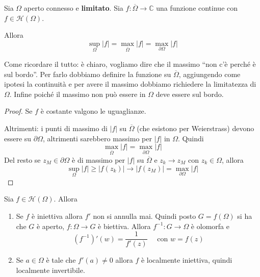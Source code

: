 \begin{corollary}
    Sia \(\Omega\) aperto connesso e \textbf{limitato}. Sia \(f :
    \overline{\Omega} \to \mathbb{C}\) una funzione continue con \(f \in
    \mathcal{H}{(\Omega)}\). 

    Allora
    \begin{equation}\label{eq:massimo-modulo}
      \sup_{\Omega} |f| = \max_{\overline{\Omega}} |f| = \max_{\partial \Omega}
      |f|
    \end{equation}
\end{corollary}
\begin{remark}
    Come ricordare il tutto: è chiaro, vogliamo dire che il massimo ``non c'è
    perché è sul bordo''. Per farlo dobbiamo definire la funzione su
    \(\overline{\Omega}\), aggiungendo come ipotesi la continuità e per avere il
    massimo dobbiamo richiedere la limitatezza di \(\Omega\). Infine poiché il
    massimo non può essere in \(\Omega\) deve essere sul bordo. 
\end{remark}
\begin{proof}
    Se \(f\) è costante valgono le uguaglianze.

    Altrimenti: i punti di massimo di \(|f|\) su \(\overline{\Omega}\)  (che
    esistono per Weierstrass) devono essere su \(\partial \Omega\), altrimenti
    sarebbero massimo per \(|f|\) in \(\Omega\). Quindi
    \[
        \max_{\overline{\Omega}} |f| = \max_{\partial \Omega} |f|
    \]
    Del resto se \(z_M \in \partial \Omega\) è di massimo per \(|f|\) su
    \(\overline{\Omega}\) e \(z_k \to z_M\) con \(z_k \in \Omega\), allora
    \[
        \sup_{\Omega} |f| \ge |f{(z_k)}| \to |f{(z_M)}| = \max_{\partial \Omega}
        |f|
    \]
\end{proof}
\begin{theorem}
    Sia \(f \in \mathcal{H}{(\Omega)}\). Allora
\begin{enumerate}[label = \roman*)]
    \item Se \(f\) è iniettiva allora \(f'\) non si annulla mai. Quindi posto
        \(G = f{(\Omega)}\) si ha che \(G\) è aperto, \(f : \Omega \to G\) è
        biettiva. Allora \(f^{-1} : G \to \Omega\) è olomorfa e 
        \[
            {(f^{-1})}'{(w)} = \frac{1}{{f'{(z)}}} \quad \text{ con } w = f{(z)}
        \]
    \item Se \(a \in \Omega\) è tale che \(f'{(a)} \neq 0\) allora \(f\) è
        localmente iniettiva, quindi localmente invertibile.
\end{enumerate}
\end{theorem}

